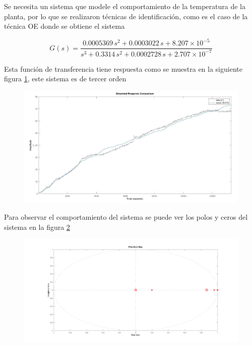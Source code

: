 \documentclass[12pt]{article}
\begin{document}
	Se necesita un sistema que modele el comportamiento de la temperatura de la planta, por lo que se realizaron técnicas de identificación, como es el caso de la técnica OE donde se obtiene el sistema 
	
	
	\begin{equation}
		G(s) = \frac{0.0005369 \, s^2 + 0.0003022 \, s + 8.207 \times 10^{-5}}{s^3 + 0.3314 \, s^2 + 0.0002728 \, s + 2.707 \times 10^{-7}}
	\end{equation}
	
	Esta función de transferencia tiene respuesta como se muestra en la siguiente figura \ref{fig:identificacion}, este sistema es de tercer orden
	
	
	\begin{figure} [h!]
		\centering
		\includegraphics[width=0.8\linewidth]{imagenes/identificacion}
		\caption{}
		\label{fig:identificacion}
	\end{figure}
	Para observar el comportamiento del sistema se puede ver los polos y ceros del sistema en la figura \ref{polos y ceros}
	
	\begin{figure} [h!]
		\centering
		\includegraphics[width=1\linewidth]{imagenes/Polos y ceros}
		\caption{}
		\label{polos y ceros}
	\end{figure}
	\newpage
\end{document}
